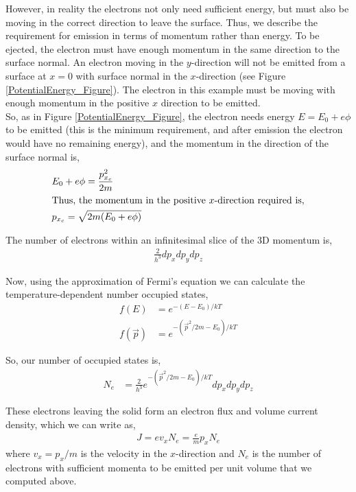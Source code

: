 However, in reality the electrons not only need sufficient energy, but must also be moving in the correct direction to leave the surface. Thus, we describe the requirement for emission in terms of momentum rather than energy. To be ejected, the electron must have enough momentum in the same direction to the surface normal. An electron moving in the $y$-direction will not be emitted from a surface at $x=0$ with surface normal in the $x$-direction (see Figure \ref{PotentialEnergy_Figure}). The electron in this example must be moving with enough momentum in the positive $x$ direction to be emitted.\\

So, as in Figure \ref{PotentialEnergy_Figure}, the electron needs energy $E = E_0 + e\phi$ to be emitted (this is the minimum requirement, and after emission the electron would have no remaining energy), and the momentum in the direction of the surface normal is,
\begin{align}
    & E_0 + e\phi = \frac{p_{x_c}^2}{2m} \\
    \intertext{Thus, the momentum in the positive $x$-direction required is,}
    & p_{x_c} = \sqrt{2m(E_0 + e\phi)} \label{CriticalMomentum}
\end{align}

The number of electrons within an infinitesimal slice of the 3D momentum is,
\begin{align}
    \frac{2}{h^3} dp_x dp_y dp_z
\end{align}

Now, using the approximation of Fermi's equation we can calculate the temperature-dependent number occupied states,
\begin{align}
    f(E) &= e^{-(E-E_0)/kT} \\
    f(\vec{p})&= e^{-(\vec{p}^2/2m - E_0)/kT}
\end{align}

So, our number of occupied states is,
\begin{align}
    N_e &= \frac{2}{h^3} e^{-(\vec{p}^2/2m - E_0)/kT}  dp_x dp_y dp_z
\end{align}

These electrons leaving the solid form an electron flux and volume current density, which we can write as,
\begin{align}
    J = e v_x N_e = \frac{e}{m} p_x N_e
\end{align}
where $v_x = p_x/m$ is the velocity in the $x$-direction and $N_e$ is the number of electrons with sufficient momenta to be emitted per unit volume that we computed above.\\

